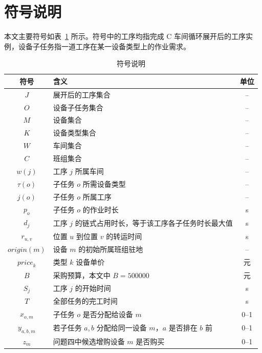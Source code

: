 \section{符号说明}

本文主要符号如表~\ref{tab:notation} 所示。符号中的工序均指完成 C 车间循环展开后的工序实例，设备子任务指一道工序在某一设备类型上的作业需求。

\begin{table}[!htbp]
  \centering
  \caption{符号说明}
  \label{tab:notation}
  \renewcommand{\arraystretch}{1.35}
  \begin{tabularx}{\textwidth}{c X c}
    \toprule
    符号 & 含义 & 单位 \\
    \midrule
    $J$ & 展开后的工序集合 & -- \\
    $O$ & 设备子任务集合 & -- \\
    $M$ & 设备集合 & -- \\
    $K$ & 设备类型集合 & -- \\
    $W$ & 车间集合 & -- \\
    $C$ & 班组集合 & -- \\
    $w(j)$ & 工序 $j$ 所属车间 & -- \\
    $\tau(o)$ & 子任务 $o$ 所需设备类型 & -- \\
    $j(o)$ & 子任务 $o$ 所属工序 & -- \\
    $p_o$ & 子任务 $o$ 的作业时长 & s \\
    $d_j$ & 工序 $j$ 的链式占用时长，等于该工序各子任务时长最大值 & s \\
    $r_{u,v}$ & 位置 $u$ 到位置 $v$ 的转运时间 & s \\
    $\mathit{origin}(m)$ & 设备 $m$ 的初始所属班组驻地 & -- \\
    $\mathit{price}_k$ & 类型 $k$ 设备单价 & 元 \\
    $B$ & 采购预算，本文中 $B=500000$ & 元 \\
    $S_j$ & 工序 $j$ 的开始时间 & s \\
    $T$ & 全部任务的完工时间 & s \\
    $x_{o,m}$ & 子任务 $o$ 是否分配给设备 $m$ & 0--1 \\
    $y_{a,b,m}$ & 若子任务 $a,b$ 分配给同一设备 $m$，$a$ 是否排在 $b$ 前 & 0--1 \\
    $z_m$ & 问题四中候选增购设备 $m$ 是否购买 & 0--1 \\
    \bottomrule
  \end{tabularx}
\end{table}
